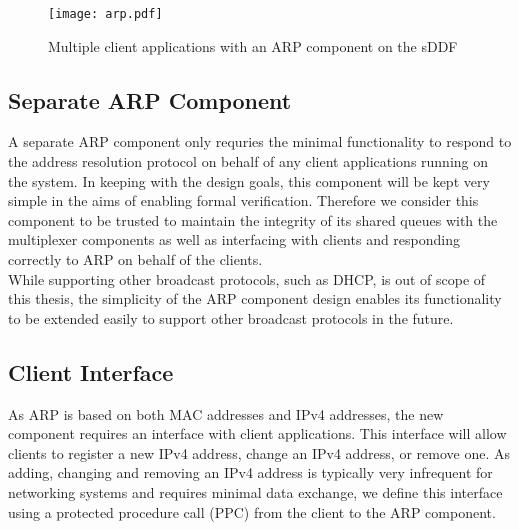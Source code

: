 \begin{figure}[h]
    \centering
    \texttt{[image: arp.pdf]}
    \caption{Multiple client applications with an ARP component on the sDDF}
    \label{f:arp}
\end{figure}

\subsection{Separate ARP Component}
A separate ARP component only requries the minimal functionality to respond to 
the address resolution protocol on behalf of any client applications running on
the system. In keeping with the design goals, this component will be kept 
very simple in the aims of enabling formal verification. Therefore we consider
this component to be trusted to maintain the integrity of its shared queues with
the multiplexer components as well as interfacing with clients and responding
correctly to ARP on behalf of the clients. \\
While supporting other broadcast protocols, such as DHCP, is out of scope of this thesis, 
the simplicity of the ARP component design enables its functionality to be extended easily
to support other broadcast protocols in the future.

\subsection{Client Interface}
As ARP is based on both MAC addresses and IPv4 addresses, the new component
requires an interface with client applications. This interface will allow clients
to register a new IPv4 address, change an IPv4 address, or remove one. As adding,
changing and removing an IPv4 address is typically very infrequent for networking systems
and requires minimal data exchange, we define this interface using a protected procedure
call (PPC) from the client to the ARP component. 

